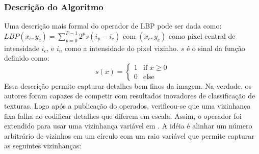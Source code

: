
\subsubsection*{Descrição do Algoritmo} %

Uma descrição mais formal do operador de LBP pode ser dada como:
$LBP(x_c, y_c) = \sum_{p=0}^{P-1} 2^p s(i_p - i_c)$
com $(x_c, y_c)$ como pixel central de intensidade $i_c$, e $i_n$ como a intensidade do pixel vizinho. $s$ é o sinal da função definido como:
\begin{equation*} s(x) = \begin{cases} 1 & \text{if $x \geq 0$}\\ 0 & \text{else} \end{cases} \end{equation*}
Essa descrição permite capturar detalhes bem finos da imagem. Na verdade, os autores foram capazes de competir com resultados inovadores de classificação de texturas. Logo após a publicação do operados, verificou-se que uma vizinhança fixa falha ao codificar detalhes que diferem em escala. Assim, o operador foi extendido para usar uma vizinhança variável em \cite{binaryface}. A idéia é alinhar um número arbitrário de vizinhos em um círculo com um raio variável que permite capturar as seguintes vizinhanças:

